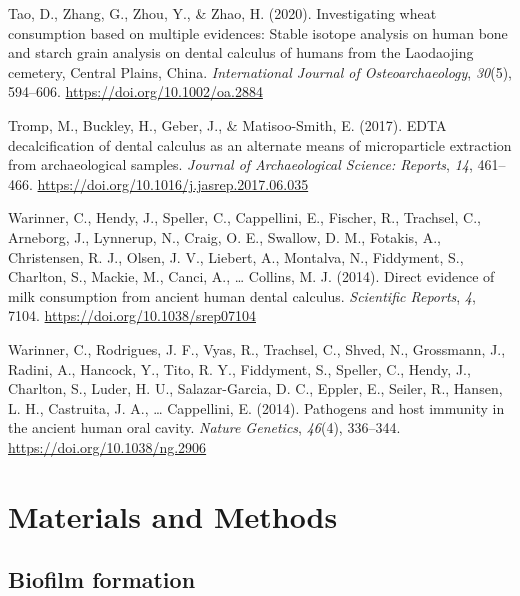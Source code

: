 \documentclass[
  letterpaper,
]{book}
\newlength{\cslhangindent}
\newlength{\cslentryspacingunit} %
\newenvironment{CSLReferences}[2] %
 {%
  \setlength{\parindent}{0pt}
  \ifodd #1
  \let\oldpar\par
  \def\par{\hangindent=\cslhangindent\oldpar}
  \fi
  \setlength{\parskip}{#2\cslentryspacingunit}
 }%
 {}
\begin{document}
\begin{CSLReferences}{1}{0}
\leavevmode{}%
Tao, D., Zhang, G., Zhou, Y., \& Zhao, H. (2020). Investigating wheat
consumption based on multiple evidences: {Stable} isotope analysis on
human bone and starch grain analysis on dental calculus of humans from
the {Laodaojing} cemetery, {Central Plains}, {China}.
\emph{International Journal of Osteoarchaeology}, \emph{30}(5),
594--606. \url{https://doi.org/10.1002/oa.2884}

\leavevmode{}%
Tromp, M., Buckley, H., Geber, J., \& Matisoo-Smith, E. (2017). {EDTA}
decalcification of dental calculus as an alternate means of
microparticle extraction from archaeological samples. \emph{Journal of
Archaeological Science: Reports}, \emph{14}, 461--466.
\url{https://doi.org/10.1016/j.jasrep.2017.06.035}

\leavevmode{}%
Warinner, C., Hendy, J., Speller, C., Cappellini, E., Fischer, R.,
Trachsel, C., Arneborg, J., Lynnerup, N., Craig, O. E., Swallow, D. M.,
Fotakis, A., Christensen, R. J., Olsen, J. V., Liebert, A., Montalva,
N., Fiddyment, S., Charlton, S., Mackie, M., Canci, A., \ldots{}
Collins, M. J. (2014). Direct evidence of milk consumption from ancient
human dental calculus. \emph{Scientific Reports}, \emph{4}, 7104.
\url{https://doi.org/10.1038/srep07104}

\leavevmode{}%
Warinner, C., Rodrigues, J. F., Vyas, R., Trachsel, C., Shved, N.,
Grossmann, J., Radini, A., Hancock, Y., Tito, R. Y., Fiddyment, S.,
Speller, C., Hendy, J., Charlton, S., Luder, H. U., Salazar-Garcia, D.
C., Eppler, E., Seiler, R., Hansen, L. H., Castruita, J. A., \ldots{}
Cappellini, E. (2014). Pathogens and host immunity in the ancient human
oral cavity. \emph{Nature Genetics}, \emph{46}(4), 336--344.
\url{https://doi.org/10.1038/ng.2906}

\end{CSLReferences}


\hypertarget{materials-and-methods-1}{%
\chapter{Materials and Methods}\label{materials-and-methods-1}}

\hypertarget{biofilm-formation}{%
\section{Biofilm formation}\label{biofilm-formation}}
\end{document}
